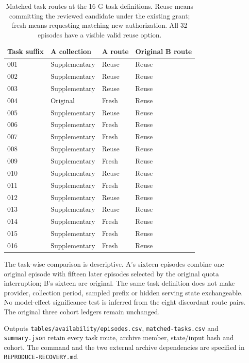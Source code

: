 \begin{table}[htbp]
\centering\small
\caption{Matched task routes at the 16 G task definitions. Reuse means committing the reviewed candidate under the existing grant; fresh means requesting matching new authorization. All 32 episodes have a visible valid reuse option.}
\begin{tabular}{llll}
\toprule
Task suffix & A collection & A route & Original B route\\
\midrule
001 & Supplementary & Reuse & Reuse\\
002 & Supplementary & Reuse & Reuse\\
003 & Supplementary & Reuse & Reuse\\
004 & Original & Fresh & Reuse\\
005 & Supplementary & Reuse & Reuse\\
006 & Supplementary & Fresh & Reuse\\
007 & Supplementary & Fresh & Reuse\\
008 & Supplementary & Reuse & Reuse\\
009 & Supplementary & Fresh & Reuse\\
010 & Supplementary & Reuse & Reuse\\
011 & Supplementary & Fresh & Reuse\\
012 & Supplementary & Reuse & Reuse\\
013 & Supplementary & Reuse & Reuse\\
014 & Supplementary & Fresh & Reuse\\
015 & Supplementary & Fresh & Reuse\\
016 & Supplementary & Fresh & Reuse\\
\bottomrule
\end{tabular}
\end{table}

The task-wise comparison is descriptive. A's sixteen episodes combine one
original episode with fifteen later episodes selected by the original quota
interruption; B's sixteen are original. The same task definition does not
make provider, collection period, sampled prefix or hidden serving state
exchangeable. No model-effect significance test is inferred from the eight
discordant route pairs. The original three cohort ledgers remain unchanged.

Outputs \texttt{tables/availability/episodes.csv},
\texttt{matched-tasks.csv} and \texttt{summary.json} retain every task route,
archive member, state/input hash and cohort. The command and the two external
archive dependencies are specified in \texttt{REPRODUCE-RECOVERY.md}.

